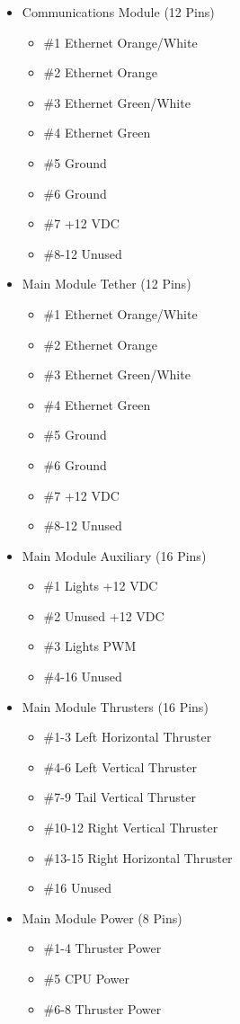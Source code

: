 \documentclass[
10pt, %
a4paper, %
oneside, %
headinclude,footinclude, %
BCOR5mm, %
]{scrartcl}
\begin{document}
\begin{itemize}[noitemsep] %
	\item Communications Module (12 Pins)
	\begin{itemize}[noitemsep]
		\item \#1 Ethernet Orange/White
		\item \#2 Ethernet Orange
		\item \#3 Ethernet Green/White
		\item \#4 Ethernet Green
		\item \#5 Ground
		\item \#6 Ground
		\item \#7 +12 VDC
		\item \#8-12 Unused
	\end{itemize}
	\item Main Module Tether (12 Pins)
		\begin{itemize}[noitemsep]
		\item \#1 Ethernet Orange/White
		\item \#2 Ethernet Orange
		\item \#3 Ethernet Green/White
		\item \#4 Ethernet Green
		\item \#5 Ground
		\item \#6 Ground
		\item \#7 +12 VDC
		\item \#8-12 Unused
	\end{itemize}
	\item Main Module Auxiliary (16 Pins)
		\begin{itemize}[noitemsep]
		\item \#1 Lights +12 VDC
		\item \#2 Unused +12 VDC
		\item \#3 Lights PWM
		\item \#4-16 Unused
	\end{itemize}
	\item Main Module Thrusters (16 Pins)
		\begin{itemize}[noitemsep]
		\item \#1-3 Left Horizontal Thruster
		\item \#4-6 Left Vertical Thruster
		\item \#7-9 Tail Vertical Thruster
		\item \#10-12 Right Vertical Thruster
		\item \#13-15 Right Horizontal Thruster
		\item \#16 Unused
	\end{itemize}
	\item Main Module Power (8 Pins)
		\begin{itemize}[noitemsep]
		\item \#1-4 Thruster Power
		\item \#5 CPU Power
		\item \#6-8 Thruster Power


\end{itemize}
\end{itemize}
\end{document}
